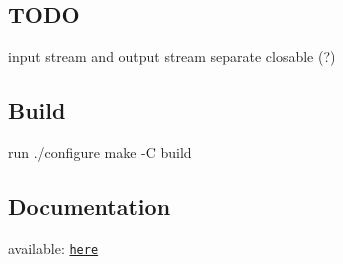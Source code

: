 \subsection*{T\+O\+DO}


\begin{DoxyItemize}
\item input stream and output stream separate closable (?)
\end{DoxyItemize}

\subsection*{Build}

run ./configure make -\/C build

\subsection*{Documentation}

available\+: \href{doc/html/}{\tt here} 